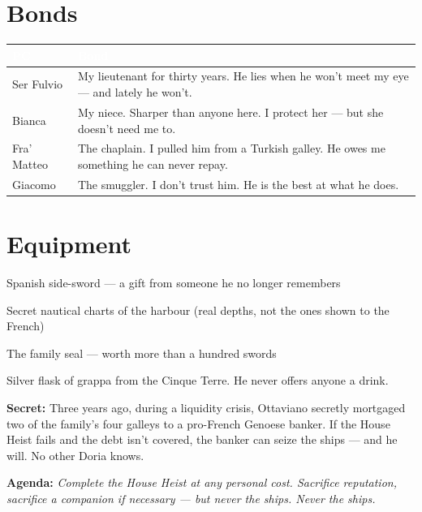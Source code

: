 \section*{Bonds}

\begin{table}[h]
\centering\renewcommand{\arraystretch}{1.4}
\begin{tabularx}{\linewidth}{@{}L{2.4cm} X@{}}
  \toprule{}
  \textcolor{white}{\textbf{PC}} & \textcolor{white}{\textbf{Bond}} \\
  \midrule
  Ser Fulvio & My lieutenant for thirty years. He lies when he won't meet my eye --- and lately he won't. \\
  Bianca & My niece. Sharper than anyone here. I protect her --- but she doesn't need me to. \\
  Fra' Matteo & The chaplain. I pulled him from a Turkish galley. He owes me something he can never repay. \\
  Giacomo & The smuggler. I don't trust him. He is the best at what he does. \\
  \bottomrule
\end{tabularx}
\end{table}

\section*{Equipment}
\begin{goldlist}
  \item Spanish side-sword --- a gift from someone he no longer remembers
  \item Secret nautical charts of the harbour (real depths, not the ones shown to the French)
  \item The family seal --- worth more than a hundred swords
  \item Silver flask of grappa from the Cinque Terre. He never offers anyone a drink.
\end{goldlist}

\clearpage

\begin{secretbox}
  \textbf{Secret:} Three years ago, during a liquidity crisis, Ottaviano secretly
  mortgaged two of the family's four galleys to a pro-French Genoese banker. If the
  House Heist fails and the debt isn't covered, the banker can seize the ships --- and
  he will. No other Doria knows.

  \medskip\noindent\textcolor{SecretRed}{\textbf{Agenda:}}
  \textit{Complete the House Heist at any personal cost. Sacrifice reputation,
  sacrifice a companion if necessary --- but never the ships. Never the ships.}
\end{secretbox}

